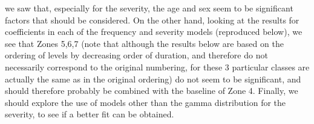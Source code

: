 \documentclass[11pt]{article}
\begin{document}
\begin{enumerate}
   we saw that, especially for the severity, the age and sex seem to be significant factors that should be considered. On the other hand, looking at the results for coefficients in each of the frequency and severity models (reproduced below), we see that Zones 5,6,7 (note that although the results below are based on the ordering of levels by decreasing order of duration, and therefore do not necessarily correspond to the original numbering, for these 3 particular classes are actually the same as in the original ordering) do not seem to be significant, and should therefore probably be combined with the baseline of Zone 4. Finally, we should explore the use of models other than the gamma distribution for the severity, to see if a better fit can be obtained.
  
\end{enumerate}




 
\end{document}
